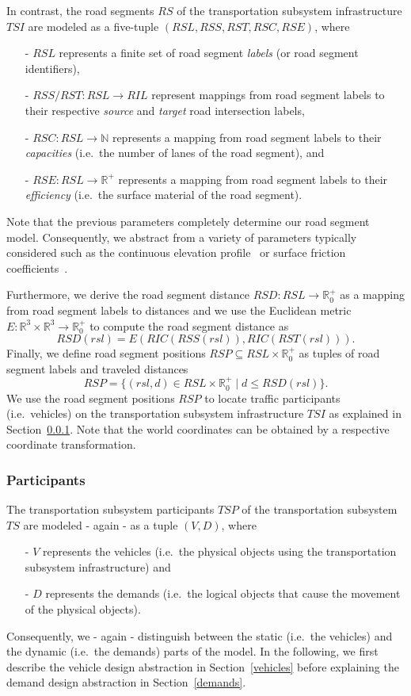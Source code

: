 In contrast, the road segments $RS$ of the transportation subsystem infrastructure $TSI$ are modeled as a five-tuple $(RSL, RSS, RST, RSC, RSE)$, where
\begin{itemize}
	\item[-] $RSL$ represents a finite set of road segment \textit{labels} (or road segment identifiers),
	\item[-] $RSS/RST: RSL \rightarrow RIL$ represent mappings from road segment labels to their respective \textit{source} and \textit{target} road intersection labels,
	\item[-] $RSC: RSL \rightarrow \mathbb{N}$ represents a mapping from road segment labels to their \textit{capacities} (i.e.\ the number of lanes of the road segment), and
	\item[-] $RSE: RSL \rightarrow \mathbb{R}^+$ represents a mapping from road segment labels to their \textit{efficiency} (i.e.\ the surface material of the road segment).
\end{itemize}
Note that the previous parameters completely determine our road segment model. Consequently, we abstract from a variety of parameters typically considered such as the continuous elevation profile~\cite{?} or surface friction coefficients~\cite{?}.

Furthermore, we derive the road segment distance $RSD: RSL \rightarrow \mathbb{R}_0^+$ as a mapping from road segment labels to distances and we use the Euclidean metric $E: \mathbb{R}^3 \times \mathbb{R}^3 \rightarrow \mathbb{R}_0^+$ to compute the road segment distance as
\[
	RSD(rsl) = E(RIC(RSS(rsl)), RIC(RST(rsl))) \textrm{.}
\]
Finally, we define road segment positions $RSP \subseteq RSL \times \mathbb{R}_0^+$ as tuples of road segment labels and traveled distances
\[
	RSP = \{(rsl, d) \in RSL \times \mathbb{R}_0^+ \mid d \leq RSD(rsl)\} \textrm{.}
\]
We use the road segment positions $RSP$ to locate traffic participants (i.e.\ vehicles) on the transportation subsystem infrastructure $TSI$ as explained in Section~\ref{participants}. Note that the world coordinates can be obtained by a respective coordinate transformation.

\subsubsection{Participants}
\label{participants}

The transportation subsystem participants $TSP$ of the transportation subsystem $TS$ are modeled - again - as a tuple $(V, D)$, where
\begin{itemize}
	\item[-] $V$ represents the vehicles (i.e.\ the physical objects using the transportation subsystem infrastructure) and
	\item[-] $D$ represents the demands (i.e.\ the logical objects that cause the movement of the physical objects).
\end{itemize}
Consequently, we - again - distinguish between the static (i.e.\ the vehicles) and the dynamic (i.e.\ the demands) parts of the model. In the following, we first describe the vehicle design abstraction in Section~\ref{vehicles} before explaining the demand design abstraction in Section~\ref{demands}.

